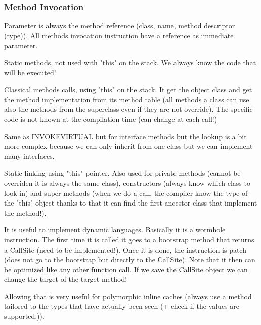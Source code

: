 \subsubsection{Method Invocation}
Parameter is always the method reference (class, name, method descriptor (type)).
All methods invocation instruction have a reference as immediate parameter.
\theoremstyle{definition}
\begin{definition}[INVOKESTATIC]
    Static methods, not used with "this" on the stack. We always know the code
    that will be executed!
\end{definition}
\theoremstyle{definition}
\begin{definition}[INVOKEVIRTUAL]
    Classical methods calls, using "this" on the stack. It get the object class
    and get the method implementation from its method table (all methods a class
    can use also the methods from the superclass even if they are not
    override). The specific code is not known at the compilation time (can
    change at each call!)
\end{definition}
\theoremstyle{definition}
\begin{definition}[INVOKEINTERFACE]
    Same as INVOKEVIRTUAL but for interface methods but the lookup is a bit more
    complex because we can only inherit from one class but we can implement many
    interfaces.
\end{definition}
\theoremstyle{definition}
\begin{definition}[INVOKESPECIAL]
    Static linking using "this" pointer. Also used for private methods (cannot
    be overriden it is always the same class), constructors (always know which
    class to look in) and super methods (when we do a call, the compiler know
    the type of the "this" object thanks to that it can find the first ancestor
    class that implement the method!).
\end{definition}
\theoremstyle{definition}
\begin{definition}[INVOKEDYNAMIC]
    It is useful to implement dynamic languages. Basically it is a wormhole
    instruction. The first time it is called it goes to a bootstrap method that
    returns a CallSite (need to be implemented!). Once it is done, the
    instruction is patch (does not go to the bootstrap but directly to the
    CallSite). Note that it then can be optimized like any other function call.
    If we save the CallSite object we can change the target of the target method!

    Allowing that is very useful for polymorphic inline caches (always use a
    method tailored to the types that have actually been seen (+ check if the
    values are supported.)). 
\end{definition}

